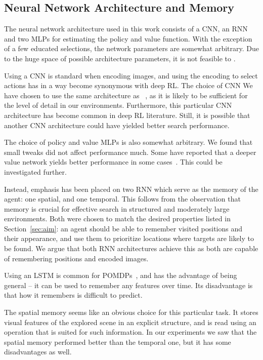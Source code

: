 \subsection{Neural Network Architecture and Memory}

The neural network architecture used in this work consists of a CNN, an RNN and two MLPs for estimating the policy and value function.
With the exception of a few educated selections, the network parameters are somewhat arbitrary.
Due to the huge space of possible architecture parameters, it is not feasible to .

Using a CNN is standard when encoding images, and using the encoding to select actions has in a way become synonymous with deep RL.
The choice of CNN 
We have chosen to use the same architecture as ~\cite{mnih_playing_2013}, as it is likely to be sufficient for the level of detail in our environments.
Furthermore, this particular CNN architecture has become common in deep RL literature.
Still, it is possible that another CNN architecture could have yielded better search performance.

The choice of policy and value MLPs is also somewhat arbitrary.
We found that small tweaks did not affect performance much.
Some have reported that a deeper value network yields better performance in some cases~\cite{andrychowicz_what_2020}.
This could be investigated further.

Instead, emphasis has been placed on two RNN which serve as the memory of the agent: one spatial, and one temporal.
This follows from the observation that memory is crucial for effective search in structured and moderately large environments.
Both were chosen to match the desired properties listed in Section~\ref{sec:aim}:
an agent should be able to remember visited positions and their appearance, and use them to prioritize locations where targets are likely to be found.
We argue that both RNN architectures achieve this as both are capable of remembering positions and encoded images.

Using an LSTM is common for POMDPs~\cite{hausknecht_deep_2017,mnih_asynchronous_2016,mirowski_learning_2017}, and has the advantage of being general --
it can be used to remember any features over time.
Its disadvantage is that how it remembers is difficult to predict.

The spatial memory seems like an obvious choice for this particular task.
It stores visual features of the explored scene in an explicit structure, and is read using an operation that is suited for such information.
In our experiments we saw that the spatial memory performed better than the temporal one,
but it has some disadvantages as well.

